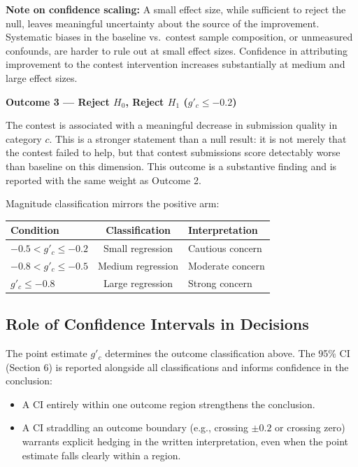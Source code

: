 \documentclass[11pt]{article}
\begin{document}
\textbf{Note on confidence scaling:} A small effect size, while sufficient to reject the null, leaves meaningful uncertainty about the source of the improvement. Systematic biases in the baseline vs.\ contest sample composition, or unmeasured confounds, are harder to rule out at small effect sizes. Confidence in attributing improvement to the contest intervention increases substantially at medium and large effect sizes.

\bigskip
\noindent\textbf{Outcome 3 --- Reject $H_0$, Reject $H_1$ ($g'_c \leq -0.2$)}

\medskip
\noindent The contest is associated with a meaningful decrease in submission quality in category $c$. This is a stronger statement than a null result: it is not merely that the contest failed to help, but that contest submissions score detectably worse than baseline on this dimension. This outcome is a substantive finding and is reported with the same weight as Outcome 2.

Magnitude classification mirrors the positive arm:

\begin{center}
\begin{tabular}{lcl}
\toprule
\textbf{Condition} & \textbf{Classification} & \textbf{Interpretation} \\
\midrule
$-0.5 < g'_c \leq -0.2$ & Small regression & Cautious concern \\
$-0.8 < g'_c \leq -0.5$ & Medium regression & Moderate concern \\
$g'_c \leq -0.8$ & Large regression & Strong concern \\
\bottomrule
\end{tabular}
\end{center}

\subsection{Role of Confidence Intervals in Decisions}

The point estimate $g'_c$ determines the outcome classification above. The 95\% CI (Section 6) is reported alongside all classifications and informs confidence in the conclusion:

\begin{itemize}
    \item A CI entirely within one outcome region strengthens the conclusion.
    \item A CI straddling an outcome boundary (e.g., crossing $\pm 0.2$ or crossing zero) warrants explicit hedging in the written interpretation, even when the point estimate falls clearly within a region.
\end{itemize}
\end{document}

